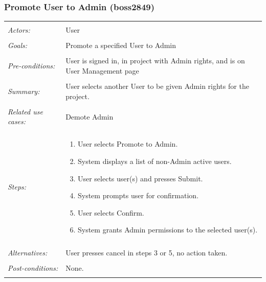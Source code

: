\documentclass[11pt]{report}
\begin{document}
\subsubsection{Promote User to Admin  (boss2849)}
\begin{tabular}{ p{2cm} p{12cm} }
 \hline
 \\
 \textit{Actors:} & User \\ 
 \\
 \textit{Goals:} & Promote a specified User to Admin \\
 \\
 \textit{Pre-conditions:} & User is signed in, in project with Admin rights, and is on User Management page \\
 \\
 \textit{Summary:} & User selects another User to be given Admin rights for the project. \\ 
 \\
 \textit{Related use cases:} & Demote Admin \\ 
 \\
 \textit{Steps:} & \begin{enumerate}
  \item User selects Promote to Admin.
  \item System displays a list of non-Admin active users.
  \item User selects user(s) and presses Submit.
  \item System prompts user for confirmation.
  \item User selects Confirm.
  \item System grants Admin permissions to the selected user(s).
 \end{enumerate} \\
 \\
 \textit{Alternatives:} & User presses cancel in steps 3 or 5, no action taken. \\
 \\
 \textit{Post-conditions:} & None. \\
 \\
\hline
\end{tabular}
\end{document}

